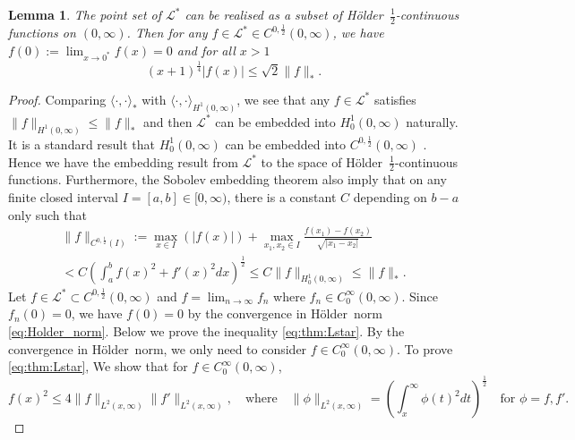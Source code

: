 \documentclass[11pt, a4paper]{article}
\numberwithin{equation}{section}
\newcommand{\Lstar}{\mathcal{L}^*}
\newcommand{\Holder}{H\"older}
\newtheorem{lem}{Lemma}
\theoremstyle{definition}
\theoremstyle{remark}
\begin{document}
\begin{lem} \label{lem:various_convergences}
  The point set of $\Lstar$ can be realised as a subset of \Holder\ $\frac{1}{2}$-continuous functions on $(0, \infty)$. Then for any $f \in \Lstar \in C^{0, \frac{1}{2}}(0, \infty)$, we have $f(0) := \lim_{x \to 0^*} f(x) = 0$ and for all $x > 1$
  \begin{equation} \label{eq:thm:Lstar}
    (x + 1)^{\frac{1}{4}} \lvert f(x) \rvert \leq \sqrt{2} \lVert f \rVert_*.
  \end{equation}
\end{lem}
\begin{proof}
  Comparing $\langle \cdot, \cdot \rangle_*$ with $\langle \cdot, \cdot \rangle_{H^1(0, \infty)}$, we see that any $f \in \Lstar$ satisfies $\lVert f \rVert_{H^1(0, \infty)} \leq \lVert f \rVert_*$ and then $\Lstar$ can be embedded into $H^1_0(0, \infty)$ naturally. It is a standard result that $H^1_0(0, \infty)$ can be embedded into $C^{0, \frac{1}{2}}(0, \infty)$ \cite[Theorem 4.12, Part II]{Adams-Fournier03}. Hence we have the embedding result from $\Lstar$ to the space of \Holder\ $\frac{1}{2}$-continuous functions. Furthermore, the Sobolev embedding theorem also imply that on any finite closed interval $I = [a, b] \in [0, \infty)$, there is a constant $C$ depending on $b - a$ only such that
  \begin{multline} \label{eq:Holder_norm}
    \lVert f \rVert_{C^{0, \frac{1}{2}}(I)} := \max_{x \in I}(\lvert f(x) \rvert) + \max_{x_1, x_2 \in I} \frac{f(x_1) - f(x_2)}{\sqrt{\lvert x_1 - x_2 \rvert}} \\
    < C \left( \int^b_a f(x)^2 + f'(x)^2 dx \right)^{\frac{1}{2}} \leq C \lVert f \rVert_{H^1_0(0, \infty)} \leq \lVert f \rVert_*.
  \end{multline}
  Let $f \in \Lstar \subset C^{0, \frac{1}{2}}(0, \infty)$ and $f = \lim_{n \to \infty} f_n$ where $f_n \in C^{\infty}_0(0, \infty)$. Since $f_n(0) = 0$, we have $f(0) = 0$ by the convergence in \Holder\ norm \eqref{eq:Holder_norm}. Below we prove the inequality \eqref{eq:thm:Lstar}. By the convergence in \Holder\ norm, we only need to consider $f \in C^{\infty}_0(0, \infty)$.  To prove \eqref{eq:thm:Lstar}, We show that for $f \in C^{\infty}_0(0, \infty)$,
  \begin{equation} \label{eq:intermediate_ineq}
    f(x)^2 \leq 4 \lVert f \rVert_{L^2(x, \infty)} \lVert f' \rVert_{L^2(x, \infty)}, \quad \text{where} \quad \lVert \phi \rVert_{L^2(x, \infty)} = \left( \int^{\infty}_x \phi(t)^2 dt \right)^{\frac{1}{2}} \quad \text{for $\phi = f, f'$}.

\end{equation}
\end{proof}
\end{document}
